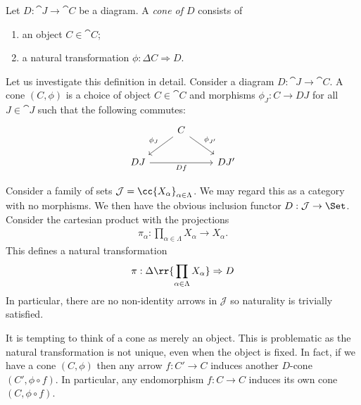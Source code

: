 \documentclass{article}
\begin{document}
\begin{definition}
  Let $D:\cat{J}\to\cat{C}$ be a diagram. A \emph{cone of $D$} consists of
  \begin{enumerate}
    \item an object $C\in\cat{C}$;
    \item a natural transformation $\phi:\Delta C\Rightarrow D$.
  \end{enumerate}
\end{definition}

Let us investigate this definition in detail. Consider a diagram
$D:\cat{J}\to\cat{C}$. A cone $(C,\phi)$ is a choice of object $C\in\cat{C}$
and morphisms $\phi_J:C\to DJ$ for all $J\in\cat{J}$ such that the following
commutes:
\begin{equation}
  \begin{tikzcd}
  & C \\
    DJ && {DJ'}
    \arrow["Df"', from=2-1, to=2-3]
    \arrow["{\phi_{J'}}", from=1-2, to=2-3]
    \arrow["{\phi_J}"', from=1-2, to=2-1]
  \end{tikzcd}
\end{equation}

\begin{example}
  Consider a family of sets $\mathcal J=\cc{X_\alpha}_{\alpha\in\Lambda}$. We may
  regard this as a category with no morphisms. We then have
  the obvious inclusion functor $D:\mathcal J\to\Set$. Consider the cartesian
  product with the projections
  \begin{align*}
    \pi_\alpha : \prod_{\alpha\in\Lambda} X_\alpha \to X_\alpha.
  \end{align*}
  This defines a natural transformation
  \begin{align*}
    \pi : \Delta\rr{\prod_{\alpha\in\Lambda} X_\alpha}\Rightarrow D
  \end{align*}
  In particular, there are no non-identity arrows in $\mathcal J$ so
  naturality is trivially satisfied.
\end{example}

It is tempting to think of a cone as merely an object. This is problematic as
the natural transformation is not unique, even when the object is fixed. In
fact, if we have a cone $(C,\phi)$ then any arrow $f:C'\to C$ induces another
$D$-cone $(C',\phi\circ f)$. In particular, any endomorphism $f:C\to C$ induces
its own cone $(C,\phi\circ f)$.
\end{document}
